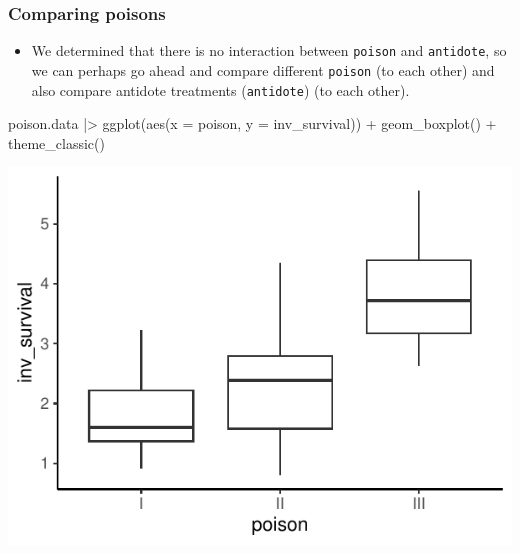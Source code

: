 \documentclass[a4paper]{article}\usepackage[]{graphicx}\usepackage[]{xcolor}
\makeatletter
\def\maxwidth{ %
  \ifdim\Gin@nat@width>\linewidth
    \linewidth
  \else
    \Gin@nat@width
  \fi
}
\makeatother
\begin{document}
\subsubsection{Comparing poisons}
\begin{itemize}
	\item We determined that there is no interaction between \lstinline|poison| and \lstinline|antidote|, so we can perhaps go ahead and compare different \lstinline|poison| (to each other) and also compare antidote treatments (\lstinline|antidote|) (to each other).
\end{itemize}
\begin{minipage}[t]{0.49\textwidth}
\begin{Schunk}
\begin{Sinput}
poison.data |> 
  ggplot(aes(x = poison, y = inv_survival)) +
  geom_boxplot() + 
  theme_classic()
\end{Sinput}


{\centering \includegraphics[width=\maxwidth]{figure/listings-unnamed-chunk-326-1} 

}

\end{Schunk}
\end{minipage}
\hspace{0.02\textwidth}
\end{document}
